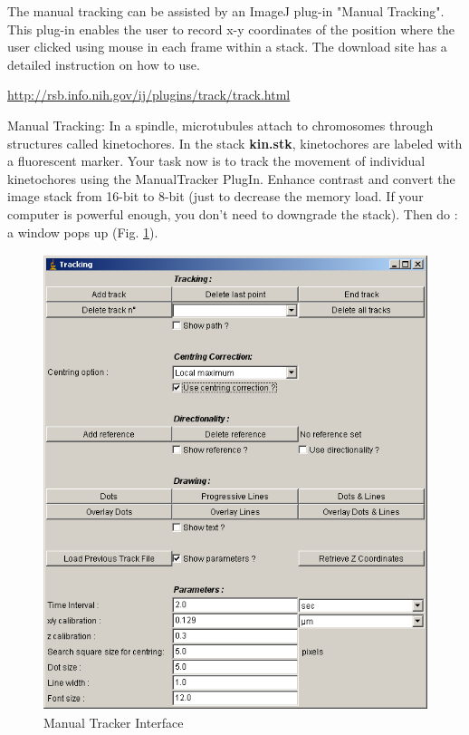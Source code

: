 The manual tracking can be assisted by an ImageJ plug-in
"Manual Tracking". This plug-in
enables the user to record x-y coordinates of the position where the
user clicked using mouse in each frame within a stack. The download
site has a detailed instruction on how to use.  


\url{http://rsb.info.nih.gov/ij/plugins/track/track.html}


\begin{indentexercise}{1}
\label{exer:manualtracking}
\item Manual Tracking: In a spindle, microtubules attach to chromosomes through structures called kinetochores. In the stack \textbf{kin.stk}, kinetochores are labeled with a fluorescent marker. Your task now is to track the movement of individual kinetochores using the ManualTracker PlugIn. Enhance contrast and convert the image stack from 16-bit to 8-bit (just to decrease the memory load. If your computer is powerful enough, you don't need to downgrade the stack). Then do : a window pops up (Fig. \ref{fig:img135}). 

\begin{figure}[H]
\begin{center}
\includegraphics[width=11.298cm,height=13.323cm]{img/CMCIBasicCourse201102-img135.png}
\caption{ Manual Tracker Interface}
\label{fig:img135}
\end{center}
\end{figure}


\end{indentexercise}
